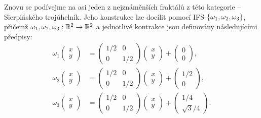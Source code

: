 Znovu se podívejme na asi jeden z nejznáměnších fraktálů z této kategorie -- Sierpińského trojúhelník. Jeho konstrukce lze docílit pomocí IFS $\left\{\omega_1,\omega_2,\omega_3\right\}$, přičemž $\omega_1,\omega_2,\omega_3:\mathbb{R}^2 \rightarrow \mathbb{R}^2$ a jednotlivé kontrakce jsou definovány následujícími předpisy:
\begin{align*}
    \omega_1\left(\begin{matrix}
        x\\
        y
    \end{matrix}\right)&=\left(\begin{matrix}
        1/2 & 0\\
        0 & 1/2
    \end{matrix}\right)\left(\begin{matrix}
        x\\
        y
    \end{matrix}\right)+\left(\begin{matrix}
        0\\
        0
    \end{matrix}\right),\\
    \omega_2\left(\begin{matrix}
        x\\
        y
    \end{matrix}\right)&=\left(\begin{matrix}
        1/2 & 0\\
        0 & 1/2
    \end{matrix}\right)\left(\begin{matrix}
        x\\
        y
    \end{matrix}\right)+\left(\begin{matrix}
        1/2\\
        0
    \end{matrix}\right),\\
    \omega_3\left(\begin{matrix}
        x\\
        y
    \end{matrix}\right)&=\left(\begin{matrix}
        1/2 & 0\\
        0 & 1/2
    \end{matrix}\right)\left(\begin{matrix}
        x\\
        y
    \end{matrix}\right)+\left(\begin{matrix}
        1/4\\
        \sqrt{3}/4
    \end{matrix}\right).
\end{align*}
